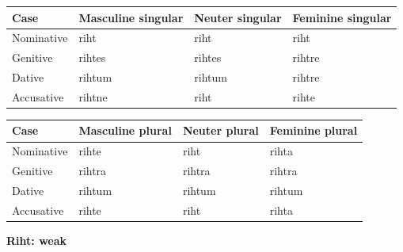 \par\begingroup
\fontsize{10.5}{13.2}\selectfont
\setlength{\LTleft}{0pt}\setlength{\LTright}{\fill}
\noindent
\begin{tabular}{@{}>{\raggedright\arraybackslash}p{22.0mm}>{\raggedright\arraybackslash}p{31.188mm}>{\raggedright\arraybackslash}p{31.188mm}>{\raggedright\arraybackslash}p{31.188mm}@{}}
\toprule
\textbf{Case} & \textbf{Masculine singular} & \textbf{Neuter singular} & \textbf{Feminine singular} \\
\midrule
Nominative & riht & riht & riht \\
Genitive & rihtes & rihtes & rihtre \\
Dative & rihtum & rihtum & rihtre \\
Accusative & rihtne & riht & rihte \\
\bottomrule
\end{tabular}
\par\endgroup
\par\addvspace{5pt}
\par\begingroup
\fontsize{10.5}{13.2}\selectfont
\setlength{\LTleft}{0pt}\setlength{\LTright}{\fill}
\noindent
\begin{tabular}{@{}>{\raggedright\arraybackslash}p{22.0mm}>{\raggedright\arraybackslash}p{31.188mm}>{\raggedright\arraybackslash}p{31.188mm}>{\raggedright\arraybackslash}p{31.188mm}@{}}
\toprule
\textbf{Case} & \textbf{Masculine plural} & \textbf{Neuter plural} & \textbf{Feminine plural} \\
\midrule
Nominative & rihte & riht & rihta \\
Genitive & rihtra & rihtra & rihtra \\
Dative & rihtum & rihtum & rihtum \\
Accusative & rihte & riht & rihta \\
\bottomrule
\end{tabular}
\par\endgroup

\textbf{Riht: weak}

